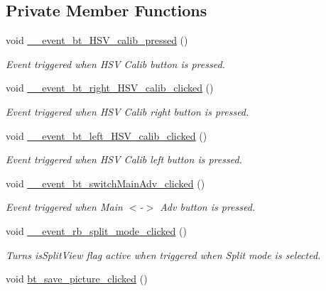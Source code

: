 \subsection*{Private Member Functions}
\begin{DoxyCompactItemize}
\item 
void \hyperlink{class_vision_g_u_i_ad476738b0d45d8decb5d5789c7cbc611}{\+\_\+\+\_\+event\+\_\+bt\+\_\+\+H\+S\+V\+\_\+calib\+\_\+pressed} ()
\begin{DoxyCompactList}\small\item\em Event triggered when H\+SV Calib button is pressed. \end{DoxyCompactList}\item 
void \hyperlink{class_vision_g_u_i_a5de4edcfe2bd349f940dc605a52bc70b}{\+\_\+\+\_\+event\+\_\+bt\+\_\+right\+\_\+\+H\+S\+V\+\_\+calib\+\_\+clicked} ()
\begin{DoxyCompactList}\small\item\em Event triggered when H\+SV Calib right button is pressed. \end{DoxyCompactList}\item 
void \hyperlink{class_vision_g_u_i_aa6d54a685b4bddbad91778a442fd7c8e}{\+\_\+\+\_\+event\+\_\+bt\+\_\+left\+\_\+\+H\+S\+V\+\_\+calib\+\_\+clicked} ()
\begin{DoxyCompactList}\small\item\em Event triggered when H\+SV Calib left button is pressed. \end{DoxyCompactList}\item 
void \hyperlink{class_vision_g_u_i_a5e1378fbaf15105bd898f6fd9e2d3d0e}{\+\_\+\+\_\+event\+\_\+bt\+\_\+switch\+Main\+Adv\+\_\+clicked} ()
\begin{DoxyCompactList}\small\item\em Event triggered when \textquotesingle{}Main $<$-\/$>$ Adv\textquotesingle{} button is pressed. \end{DoxyCompactList}\item 
void \hyperlink{class_vision_g_u_i_a51c0888c14eb2b773e18d739df076e03}{\+\_\+\+\_\+event\+\_\+rb\+\_\+split\+\_\+mode\+\_\+clicked} ()
\begin{DoxyCompactList}\small\item\em Turns \textquotesingle{}is\+Split\+View\textquotesingle{} flag active when triggered when Split mode is selected. \end{DoxyCompactList}\item 
void \hyperlink{class_vision_g_u_i_a0f0a52b29ccd843b3e5a200d2618cd6a}{bt\+\_\+save\+\_\+picture\+\_\+clicked} ()

\end{DoxyCompactItemize}
